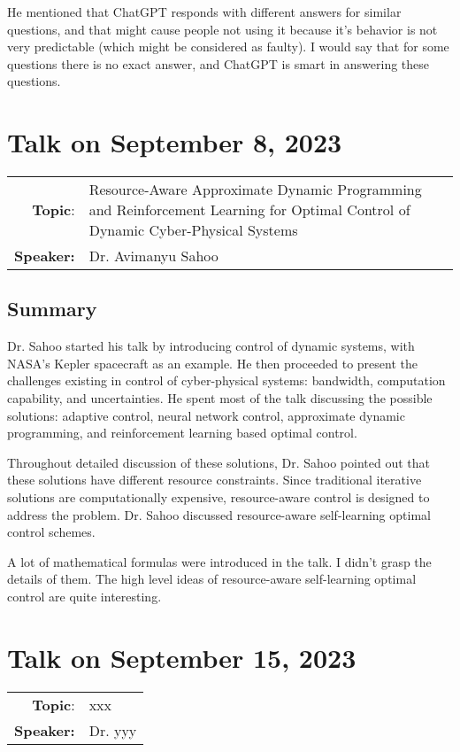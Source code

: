 \documentclass[11pt, oneside]{article}   	%
\begin{document}
He mentioned that ChatGPT responds with different answers for similar questions, and that might cause people not using it because it's behavior is not very predictable (which might be considered as faulty). I would say that for some questions there is no exact answer, and ChatGPT is smart in answering these questions.

\newpage
\section{Talk on September 8, 2023}
\begin{tabularx} {\textwidth}{r X}
\textbf{Topic}: & Resource-Aware Approximate Dynamic Programming and Reinforcement Learning for Optimal Control of Dynamic Cyber-Physical Systems \\
\textbf{Speaker:} & Dr. Avimanyu Sahoo\\
\end{tabularx}

\subsection{Summary}
Dr. Sahoo started his talk by introducing control of dynamic systems, with NASA's Kepler spacecraft as an example. He then proceeded to present the challenges existing in control of cyber-physical systems: bandwidth, computation capability, and uncertainties. He spent most of the talk discussing the possible solutions: adaptive control, neural network control, approximate dynamic programming, and reinforcement learning based optimal control.

Throughout detailed discussion of these solutions, Dr. Sahoo pointed out that these solutions have different resource constraints. Since traditional iterative solutions are computationally expensive, resource-aware control is designed to address the problem. Dr. Sahoo discussed resource-aware self-learning optimal control schemes. 

A lot of mathematical formulas were introduced in the talk. I didn't grasp the details of them. The high level ideas of resource-aware self-learning optimal control are quite interesting. 


\newpage
\section{Talk on September 15, 2023}
\begin{tabularx} {\textwidth}{r X}
\textbf{Topic}: & xxx\\
\textbf{Speaker:} & Dr. yyy\\
\end{tabularx}
\end{document}

